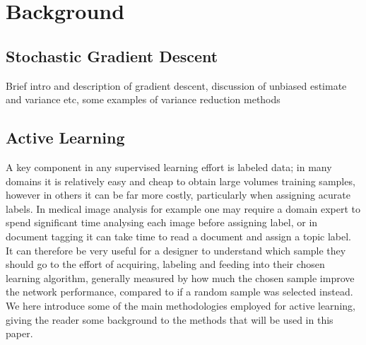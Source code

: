 \chapter{Background}

\section{Stochastic Gradient Descent}
Brief intro and description of gradient descent, discussion of unbiased estimate and variance etc, some examples of variance reduction methods

\section{Active Learning}
A key component in any supervised learning effort is labeled data; in many domains it is relatively easy and cheap to obtain large volumes training samples, however in others it can be far more costly, particularly when assigning acurate labels. In medical image analysis for example one may require a domain expert to spend significant time analysing each image before assigning label, or in document tagging it can take time to read a document and assign a topic label. It can therefore be very useful for a designer to understand which sample they should go to the effort of acquiring, labeling and feeding into their chosen learning algorithm, generally measured by how much the chosen sample improve the network performance, compared to if a random sample was selected instead. We here introduce some of the main methodologies employed for active learning, giving the reader some background to the methods that will be used in this paper.

